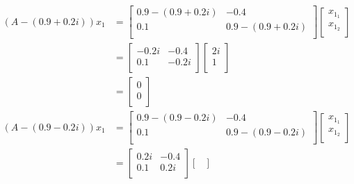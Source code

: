 \documentclass{article}
\begin{document}
\begin{itemize}
\begin{itemize}
        \begin{align*}
            (A-(0.9+0.2i))x_1 &=
            \begin{bmatrix}
                0.9-(0.9+0.2i) & -0.4\\
                0.1 & 0.9-(0.9+0.2i)\\
            \end{bmatrix}
            \begin{bmatrix}
                x_{1_1}\\
                x_{1_2}\\
            \end{bmatrix}\\
            &=
            \begin{bmatrix}
                -0.2i & -0.4\\
                0.1 & -0.2i\\
            \end{bmatrix}
            \begin{bmatrix}
                2i\\
                1\\
            \end{bmatrix}\\
            &=
            \begin{bmatrix}
                0\\
                0\\
            \end{bmatrix}
        \end{align*}
        \begin{align*}
            (A-(0.9-0.2i))x_1 &=
            \begin{bmatrix}
                0.9-(0.9-0.2i) & -0.4\\
                0.1 & 0.9-(0.9-0.2i)\\
            \end{bmatrix}
            \begin{bmatrix}
                x_{1_1}\\
                x_{1_2}\\
            \end{bmatrix}\\
            &=
            \begin{bmatrix}
                0.2i & -0.4\\
                0.1 & 0.2i\\
            \end{bmatrix}
            \begin{bmatrix}

\end{bmatrix}
\end{align*}
\end{itemize}
\end{itemize}
\end{document}

